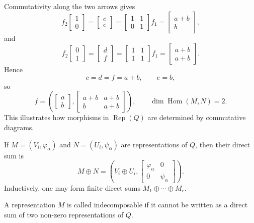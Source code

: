 \documentclass[11pt, a4paper]{report}
\begin{document}
\begin{example}
Commutativity along the two arrows gives
\[
f_2\begin{bmatrix}1\\0\end{bmatrix}
=
\begin{bmatrix}c\\e\end{bmatrix}
=
\begin{bmatrix}1&1\\0&1\end{bmatrix}
f_1
=
\begin{bmatrix}a+b\\b\end{bmatrix},
\]
and
\[
f_2\begin{bmatrix}0\\1\end{bmatrix}
=
\begin{bmatrix}d\\f\end{bmatrix}
=
\begin{bmatrix}1&1\\1&1\end{bmatrix}
f_1
=
\begin{bmatrix}a+b\\a+b\end{bmatrix}.
\]
Hence
\[
c=d=f=a+b,
\qquad
e=b,
\]
so
\[
f=
\left(
\begin{bmatrix}a\\b\end{bmatrix},
\begin{bmatrix}a+b&a+b\\b&a+b\end{bmatrix}
\right),
\qquad
\dim \operatorname{Hom}(M,N)=2.
\]
This illustrates how morphisms in $\operatorname{Rep}(Q)$ are determined by commutative diagrams.
\end{example}

\begin{definition}
    If $M=(V_i,\varphi_\alpha)$ and $N=(U_i,\psi_\alpha)$ are representations of $Q$, then their direct sum is
\[
M \oplus N=
\left(
V_i \oplus U_i,
\begin{bmatrix}
\varphi_\alpha & 0 \\
0 & \psi_\alpha
\end{bmatrix}
\right).
\]
Inductively, one may form finite direct sums $M_1 \oplus \cdots \oplus M_r$.
\end{definition}

\begin{definition}
A representation $M$ is called indecomposable if it cannot be written as a direct sum of two non-zero representations of $Q$.
\end{definition}
\end{document}
